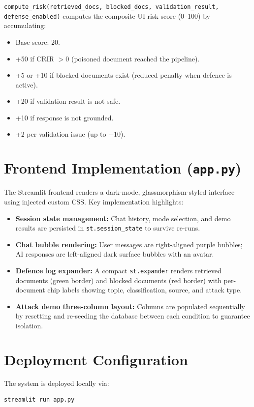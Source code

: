 \texttt{compute\_risk(retrieved\_docs, blocked\_docs, validation\_result, defense\_enabled)} computes the composite UI risk score (0--100) by accumulating:
\begin{itemize}
    \item Base score: 20.
    \item +50 if CRIR $> 0$ (poisoned document reached the pipeline).
    \item +5 or +10 if blocked documents exist (reduced penalty when defence is active).
    \item +20 if validation result is not safe.
    \item +10 if response is not grounded.
    \item +2 per validation issue (up to +10).
\end{itemize}

\section{Frontend Implementation (\texttt{app.py})}

The Streamlit frontend renders a dark-mode, glassmorphism-styled interface using injected custom CSS. Key implementation highlights:

\begin{itemize}
    \item \textbf{Session state management:} Chat history, mode selection, and demo results are persisted in \texttt{st.session\_state} to survive re-runs.
    \item \textbf{Chat bubble rendering:} User messages are right-aligned purple bubbles; AI responses are left-aligned dark surface bubbles with an avatar.
    \item \textbf{Defence log expander:} A compact \texttt{st.expander} renders retrieved documents (green border) and blocked documents (red border) with per-document chip labels showing topic, classification, source, and attack type.
    \item \textbf{Attack demo three-column layout:} Columns are populated sequentially by resetting and re-seeding the database between each condition to guarantee isolation.
\end{itemize}

\section{Deployment Configuration}

The system is deployed locally via:
\begin{verbatim}
streamlit run app.py
\end{verbatim}

